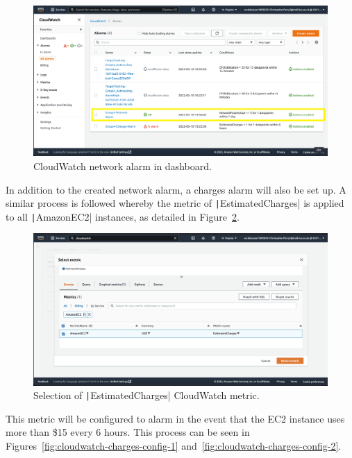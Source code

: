 \begin{figure}[!htbp]
    \centering
    \includegraphics[width=\textwidth]{resources/cloudwatch/cloudwatch-network-alarm-complete}
    \caption{CloudWatch network alarm in dashboard.}
    \label{fig:cloudwatch-network-alarm}
\end{figure}

In addition to the created network alarm, a charges alarm will also be set up.
A similar process is followed whereby the metric of \texttt|EstimatedCharges| is applied to all
\texttt|AmazonEC2| instances, as detailed in Figure~\ref{fig:cloudwatch-metric-charges}.

\begin{figure}[!htbp]
    \centering
    \includegraphics[width=\textwidth]{resources/cloudwatch/cloudwatch-metric-charges}
    \caption{Selection of \texttt|EstimatedCharges| CloudWatch metric.}
    \label{fig:cloudwatch-metric-charges}
\end{figure}

This metric will be configured to alarm in the event that the EC2 instance uses more than \$15 every 6 hours.
This process can be seen in Figures~\ref{fig:cloudwatch-charges-config-1} and~\ref{fig:cloudwatch-charges-config-2}.

